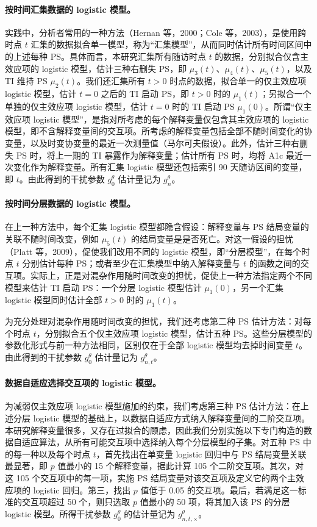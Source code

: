 \paragraph{按时间汇集数据的 logistic 模型。}
实践中，分析者常用的一种方法（Hernan 等，2000；Cole 等，2003），是使用跨时点 $t$ 汇集的数据拟合单一模型，称为“汇集模型”，从而同时估计所有时间区间中的上述每种 PS。具体而言，本研究汇集所有随访时点 $t$ 的数据，分别拟合仅含主效应项的 logistic 模型，估计三种右删失 PS，即 $\mu_3(t)$、$\mu_4(t)$、$\mu_5(t)$，以及 TI 维持 PS $\mu_2(t)$。我们还汇集所有 $t>0$ 时点的数据，拟合单一的仅主效应项 logistic 模型，估计 $t=0$ 之后的 TI 启动 PS，即 $t>0$ 时的 $\mu_1(t)$；另拟合一个单独的仅主效应项 logistic 模型，估计 $t=0$ 时的 TI 启动 PS $\mu_1(0)$。所谓“仅主效应项 logistic 模型”，是指对所考虑的每个解释变量仅包含其主效应项的 logistic 模型，即不含解释变量间的交互项。所考虑的解释变量包括全部不随时间变化的协变量，以及时变协变量的最近一次测量值（马尔可夫假设）。此外，估计三种右删失 PS 时，将上一期的 TI 暴露作为解释变量；估计所有 PS 时，均将 A1c 最近一次变化作为解释变量。所有汇集 logistic 模型还包括索引 90 天随访区间的变量，即 $t$。由此得到的干扰参数 $g_0^\theta$ 估计量记为 $g_n^\theta$。

\paragraph{按时间分层数据的 logistic 模型。}
在上一种方法中，每个汇集 logistic 模型都隐含假设：解释变量与 PS 结局变量的关联不随时间改变，例如 $\mu_5(t)$ 的结局变量是是否死亡。对这一假设的担忧（Platt 等，2009），促使我们改用不同的 logistic 模型，即“分层模型”，在每个时点 $t$ 分别估计每种 PS；或者至少在汇集模型中纳入解释变量与 $t$ 的函数之间的交互项。实际上，正是对混杂作用随时间改变的担忧，促使上一种方法指定两个不同模型来估计 TI 启动 PS：一个分层 logistic 模型估计 $\mu_1(0)$，另一个汇集 logistic 模型同时估计全部 $t>0$ 时的 $\mu_1(t)$。

为充分处理对混杂作用随时间改变的担忧，我们还考虑第二种 PS 估计方法：对每个时点 $t$，分别拟合五个仅主效应项 logistic 模型，估计五种 PS。这些分层模型的参数化形式与前一种方法相同，区别仅在于全部 logistic 模型均去掉时间变量 $t$。由此得到的干扰参数 $g_0^\theta$ 估计量记为 $g^\theta_{n,t}$。

\paragraph{数据自适应选择交互项的 logistic 模型。}
为减弱仅主效应项 logistic 模型施加的约束，我们考虑第三种 PS 估计方法：在上述分层 logistic 模型的基础上，以数据自适应方式纳入解释变量间的二阶交互项。本研究解释变量很多，又存在过拟合的顾虑，因此我们分别实施以下专门构造的数据自适应算法，从所有可能交互项中选择纳入每个分层模型的子集。对五种 PS 中的每一种以及每个时点 $t$，首先找出在单变量 logistic 回归中与 PS 结局变量关联最显著，即 $p$ 值最小的 15 个解释变量，据此计算 105 个二阶交互项。其次，对这 105 个交互项中的每一项，实施 PS 结局变量对该交互项及定义它的两个主效应项的 logistic 回归。第三，找出 $p$ 值低于 0.05 的交互项。最后，若满足这一标准的交互项超过 50 个，则只选取 $p$ 值最小的 50 项，将其加入该 PS 的分层 logistic 模型。所得干扰参数 $g_0^\theta$ 的估计量记为 $g^\theta_{n,t,\times}$。

